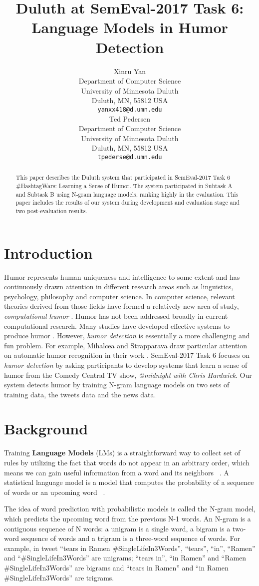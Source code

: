 \documentclass[11pt,a4paper]{article}
\title{Duluth at SemEval-2017 Task 6:  Language Models in Humor Detection}
\author{Xinru Yan \\
  Department of Computer Science \\ University of Minnesota Duluth \\ Duluth, MN, 55812 USA \\
  {\tt yanxx418@d.umn.edu} \\\And
  Ted Pedersen \\
  Department of Computer Science \\ University of Minnesota Duluth \\ Duluth, MN, 55812 USA \\
  {\tt tpederse@d.umn.edu} \\}
\date{}
\begin{document}
\maketitle
\begin{abstract}
  This paper describes the Duluth system that participated in SemEval-2017 Task 6 \#HashtagWars: Learning a Sense of Humor. The system participated in Subtask A and Subtask B using N-gram language models, ranking highly in the evaluation. This paper includes the results of our system during development and evaluation stage and two post-evaluation results. 
\end{abstract}

\section{Introduction}
Humor represents human uniqueness and intelligence to some extent and has continuously drawn attention in different research areas such as linguistics, psychology, philosophy and computer science. In computer science, relevant theories derived from those fields have formed a relatively new area of study, \textit{computational humor} \cite{Recognizing:Humor:On:Twitter}. Humor has not been addressed broadly in current computational research. Many studies have developed effective systems to produce humor \cite{ozbal2012computational}. However, \textit{humor detection} is essentially a more challenging and fun problem. For example, Mihalcea and Strapparava draw particular attention on automatic humor recognition in their work \cite{Learning:To:Laugh}. SemEval-2017 Task 6 focuses on \textit{humor detection} by asking participants to develop systems that learn a sense of humor from the Comedy Central TV show, \textit{@midnight with Chris Hardwick}. Our system detects humor by training N-gram language models on two sets of training data, the tweets data and the news data.


\section{Background}
Training \textbf{Language Models} (LMs) is a straightforward way to collect set of rules by utilizing the fact that words do not appear in an arbitrary order, which means we can gain useful information from a word and its neighbors ~\cite{JM}. A statistical language model is a model that computes the probability of a sequence of words or an upcoming word ~\cite{JM}. 

The idea of word prediction with probabilistic models is called the N-gram model, which predicts the upcoming word from the previous N-1 words. An N-gram is a contiguous sequence of N words: a unigram is a single word, a bigram is a two-word sequence of words and a trigram is a three-word sequence of words. For example, in tweet ``tears in Ramen \#SingleLifeIn3Words'', ``tears'', ``in'', ``Ramen'' and ``\#SingleLifeIn3Words'' are unigrams; ``tears in'', ``in Ramen'' and ``Ramen \#SingleLifeIn3Words'' are bigrams and ``tears in Ramen'' and ``in Ramen \#SingleLifeIn3Words'' are trigrams.
\end{document}
